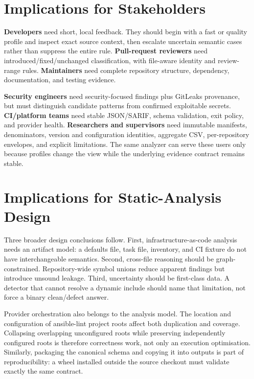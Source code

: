 \section{Implications for Stakeholders}
\textbf{Developers} need short, local feedback. They should begin with a fast
or quality profile and inspect exact source context, then escalate uncertain
semantic cases rather than suppress the entire rule. \textbf{Pull-request
reviewers} need introduced/fixed/unchanged classification, with file-aware
identity and review-range rules. \textbf{Maintainers} need complete repository
structure, dependency, documentation, and testing evidence.

\textbf{Security engineers} need security-focused findings plus GitLeaks
provenance, but must distinguish candidate patterns from confirmed exploitable
secrets. \textbf{CI/platform teams} need stable JSON/SARIF, schema validation,
exit policy, and provider health. \textbf{Researchers and supervisors} need
immutable manifests, denominators, version and configuration identities, aggregate
CSV, per-repository envelopes, and explicit limitations. The same analyzer can
serve these users only because profiles change the view while the underlying
evidence contract remains stable.

\section{Implications for Static-Analysis Design}
Three broader design conclusions follow. First, infrastructure-as-code analysis
needs an artifact model: a defaults file, task file, inventory, and CI fixture
do not have interchangeable semantics. Second, cross-file reasoning should be
graph-constrained. Repository-wide symbol unions reduce apparent findings but
introduce unsound leakage. Third, uncertainty should be first-class data. A
detector that cannot resolve a dynamic include should name that limitation,
not force a binary clean/defect answer.

Provider orchestration also belongs to the analysis model. The location and
configuration of ansible-lint project roots affect both duplication and
coverage. Collapsing overlapping unconfigured roots while preserving
independently configured roots is therefore correctness work, not only an
execution optimisation. Similarly, packaging the canonical schema and copying
it into outputs is part of reproducibility: a wheel installed outside the
source checkout must validate exactly the same contract.

